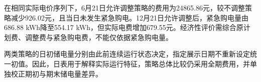 在相同实际电价序列下，6月21日允许调整策略的费用为24865.86元，较不调整策略减少926.02元，且当日未发生紧急购电。12月21日允许调整后，紧急购电量由686.88 kWh降至554.17 kWh，但实际电费增加679.55元。经济性评价需综合原计划费、调整费与紧急购电费，不能仅依据紧急购电量。

两类策略的日初储电量分别由此前连续运行状态决定，指定展示日期不重新设定统一初值。因此，日表用于解释实际运行特征，策略总体比较仍采用全期费用，并单独校正期初与期末储电量差异。
